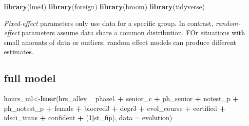 \documentclass[]{book}
\newenvironment{Shaded}{\begin{snugshade}}{\end{snugshade}}
\newcommand{\KeywordTok}[1]{\textcolor[rgb]{0.13,0.29,0.53}{\textbf{#1}}}
\newcommand{\DataTypeTok}[1]{\textcolor[rgb]{0.13,0.29,0.53}{#1}}
\newcommand{\DecValTok}[1]{\textcolor[rgb]{0.00,0.00,0.81}{#1}}
\newcommand{\StringTok}[1]{\textcolor[rgb]{0.31,0.60,0.02}{#1}}
\newcommand{\OtherTok}[1]{\textcolor[rgb]{0.56,0.35,0.01}{#1}}
\newcommand{\OperatorTok}[1]{\textcolor[rgb]{0.81,0.36,0.00}{\textbf{#1}}}
\newcommand{\NormalTok}[1]{#1}
\begin{document}
\begin{Shaded}
\begin{Highlighting}[]
\KeywordTok{library}\NormalTok{(lme4)}
\KeywordTok{library}\NormalTok{(foreign)}
\KeywordTok{library}\NormalTok{(broom)}
\KeywordTok{library}\NormalTok{(tidyverse)}
\end{Highlighting}
\end{Shaded}

\emph{Fixed-effect} parameters only use data for a specific group. In
contrast, \emph{random-effect} parameters assume data share a common
distribution. FOr situations with small amounts of data or ourliers,
random effect models can produce different estimates.

\begin{Shaded}
\end{Shaded}

\subsection{full model}\label{full-model}

\begin{Shaded}
\begin{Highlighting}[]
\NormalTok{hours_ml<-}\KeywordTok{lmer}\NormalTok{(hrs_allev }\OperatorTok{~}\StringTok{ }\NormalTok{phase1 }\OperatorTok{+}\StringTok{ }\NormalTok{senior_c }\OperatorTok{+}\StringTok{ }\NormalTok{ph_senior }\OperatorTok{+}\StringTok{ }\NormalTok{notest_p }\OperatorTok{+}\StringTok{ }\NormalTok{ph_notest_p }\OperatorTok{+}\StringTok{ }\NormalTok{female }\OperatorTok{+}\StringTok{ }\NormalTok{biocred3 }\OperatorTok{+}\StringTok{ }
\StringTok{                 }\NormalTok{degr3 }\OperatorTok{+}\StringTok{ }\NormalTok{evol_course }\OperatorTok{+}\StringTok{ }\NormalTok{certified }\OperatorTok{+}\StringTok{ }\NormalTok{idsci_trans }\OperatorTok{+}\StringTok{ }\NormalTok{confident }\OperatorTok{+}\StringTok{ }\NormalTok{(}\DecValTok{1}\OperatorTok{|}\NormalTok{st_fip), }\DataTypeTok{data =}\NormalTok{ evolution)}
\end{Highlighting}
\end{Shaded}
\end{document}
